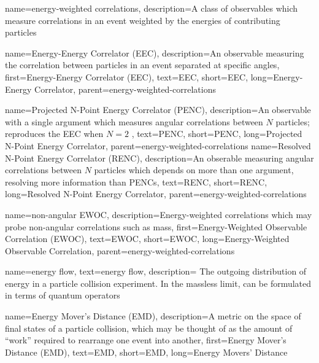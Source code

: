 {
    name=energy-weighted correlations,
    description={A class of observables which measure correlations in an event weighted by the energies of contributing particles}
}


    {
        name=Energy-Energy Correlator (EEC),
        description={An observable measuring the correlation between particles in an event separated at specific angles},
        first={Energy-Energy Correlator (EEC)},
        text={EEC},
        short={EEC},
        long={Energy-Energy Correlator},
        parent=energy-weighted-correlations
    }


    {
        name=Projected N-Point Energy Correlator (PENC),
        description={An observable with a single argument which measures angular correlations between \(N\) particles;
        reproduces the EEC when \(N=2\)
        },
        text={PENC},
        short={PENC},
        long={Projected N-Point Energy Correlator},
        parent=energy-weighted-correlations
    }
    {
        name=Resolved N-Point Energy Correlator (RENC),
        description={An obserable measuring angular correlations between \(N\) particles which depends on more than one argument, resolving more information than PENCs},
        text={RENC},
        short={RENC},
        long={Resolved N-Point Energy Correlator},
        parent=energy-weighted-correlations
    }

    {
        name=non-angular EWOC,
        description={Energy-weighted correlations which may probe non-angular correlations such as mass},
        first={Energy-Weighted Observable Correlation (EWOC)},
        text={EWOC},
        short={EWOC},
        long={Energy-Weighted Observable Correlation},
        parent=energy-weighted-correlations
    }


{
  name=energy flow,
  text=energy flow,
  description={
      The outgoing distribution of energy in a particle collision experiment.
      In the massless limit, can be formulated in terms of quantum operators
  }
}


{
    name=Energy Mover's Distance (EMD),
    description={A metric on the space of final states of a particle collision, which may be thought of as the amount of ``work'' required to rearrange one event into another},
    first={Energy Mover's Distance (EMD)},
    text={EMD},
    short={EMD},
    long={Energy Movers' Distance}
}


